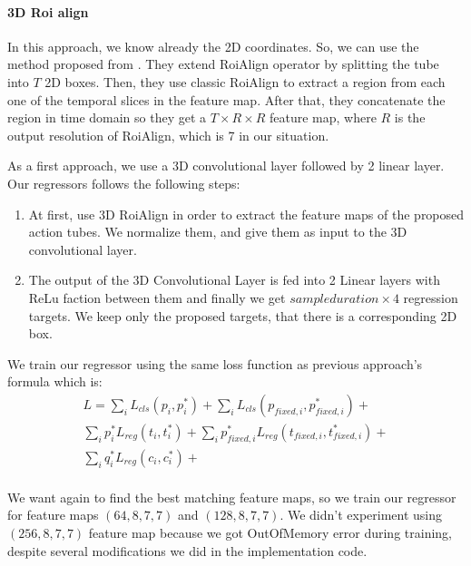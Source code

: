 \paragraph{3D Roi align}
In this approach, we know already the 2D coordinates. So, we can use the method proposed from \cite{DBLP:journals/corr/abs-1712-09184}. They
extend RoiAlign operator by splitting the tube into $T$ 2D boxes. Then, they use classic RoiAlign to extract a region from each one 
of the temporal slices in the feature map. After that, they concatenate the region in time domain so they get a $T \times R \times R$
feature map, where $R$ is the output resolution of RoiAlign, which is 7 in our situation. \par

As a first approach, we use a 3D convolutional layer followed by 2 linear layer. Our regressors follows the following steps:
\begin{enumerate}
\item At first, use 3D RoiAlign in order to extract the feature maps of the proposed action tubes. We normalize them, and give them as input to the 3D
  convolutional layer.
\item The output of the 3D Convolutional Layer is fed into 2 Linear layers with ReLu faction between them and finally we get $sample duration \times 4$
  regression targets. We keep only the proposed targets, that there is a corresponding 2D box.
\end{enumerate}


We train our regressor using the same loss function as previous approach's formula which is:
\begin{equation*} 
\begin{split}
 L  =  \sum_iL_{cls}(p_i, p_i^*) + \sum_iL_{cls}(p_{fixed,i}, p_{fixed,i}^*) + \\
 \sum_ip_i^*L_{reg}(t_i,t_i^*) + \sum_ip_{fixed,i}^*L_{reg}(t_{fixed,i},t_{fixed,i}^*) + \\
  \sum_iq_i^*L_{reg}(c_{i}, c_{i}^*) + \\
\end{split}
\end{equation*}

We want again to find the best matching feature maps, so we train our regressor for feature maps
$(64,8,7,7)$ and $(128,8,7,7)$. We didn't experiment using $(256,8,7,7)$ feature map because
we got OutOfMemory error during training, despite several modifications we did in the
implementation code.

